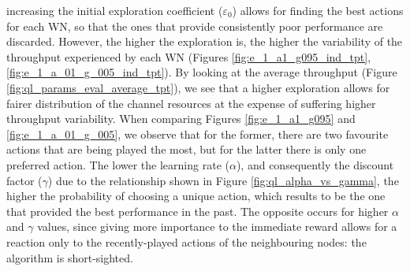 \documentclass[conference]{IEEEtran}
\begin{document}
	increasing the initial exploration coefficient ($\varepsilon_0$) allows for finding the best actions for each WN, so that the ones that provide consistently poor performance are discarded. However, the higher the exploration is, the higher the variability of the throughput experienced by each WN (Figures  \ref{fig:e_1_a1_g095_ind_tpt}, \ref{fig:e_1_a_01_g_005_ind_tpt}). By looking at the average throughput (Figure \ref{fig:ql_params_eval_average_tpt}), we see that a higher exploration allows for fairer distribution of the channel resources at the expense of suffering higher throughput variability. When comparing Figures \ref{fig:e_1_a1_g095} and \ref{fig:e_1_a_01_g_005}, we observe that for the former, there are two favourite actions that are being played the most, but for the latter there is only one preferred action. The lower the learning rate ($\alpha$), and consequently the discount factor ($\gamma$) due to the relationship shown in Figure \ref{fig:ql_alpha_vs_gamma}, the higher the probability of choosing a unique action, which results to be the one that provided the best performance in the past. The opposite occurs for higher $\alpha$ and $\gamma$ values, since giving more importance to the immediate reward allows for a reaction only to the recently-played actions of the neighbouring nodes: the algorithm is short-sighted. 
	
\end{document}

